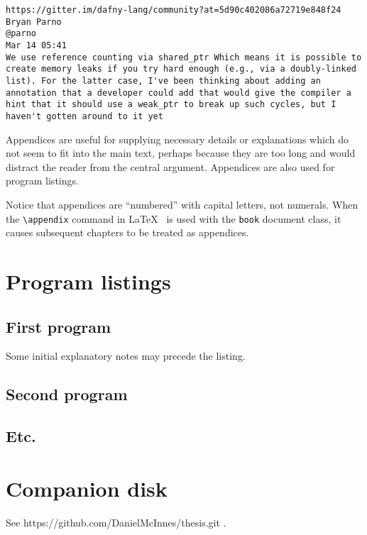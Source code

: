 \documentclass[12pt,openany,a4paper]{book}
\begin{document}
\label{dafnybug2}
\begin{verbatim}
https://gitter.im/dafny-lang/community?at=5d90c402086a72719e848f24
Bryan Parno
@parno
Mar 14 05:41
We use reference counting via shared_ptr Which means it is possible to create memory leaks if you try hard enough (e.g., via a doubly-linked list). For the latter case, I've been thinking about adding an annotation that a developer could add that would give the compiler a hint that it should use a weak_ptr to break up such cycles, but I haven't gotten around to it yet
\end{verbatim}





Appendices are useful for supplying necessary details or explanations
which do not seem to fit into the main text, perhaps because they are
too long and would distract the reader from the central argument.
Appendices are also used for program listings.

Notice that appendices are ``numbered'' with capital letters, not
numerals.  When the \verb+\appendix+ command in
\LaTeX~\cite[p.\,175]{lamport} is used with the \texttt{book} document
class, it causes subsequent chapters to be treated as appendices.

\chapter{Program listings}

\section{First program}

Some initial explanatory notes may precede the listing.

\section{Second program}

\section{Etc.}

\chapter{Companion disk}

See https://github.com/DanielMcInnes/thesis.git .
\end{document}
